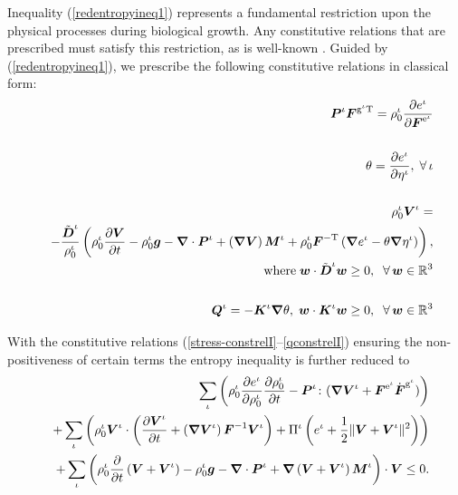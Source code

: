 \noindent Inequality (\ref{redentropyineq1}) represents a
fundamental restriction upon the physical processes during
biological growth. Any constitutive relations that are prescribed
must satisfy this restriction, as is well-known
\citep{TruesdellNoll:65}. Guided by (\ref{redentropyineq1}), we
prescribe the following constitutive relations in classical form:
\begin{eqnarray}
&&\mbox{\boldmath$ P$}^\iota\mbox{\boldmath$ F$}^{\mathrm{g}^\iota\mathrm{T}} = \rho_0^\iota
\frac{\partial e^\iota}{\partial\mbox{\boldmath$ F$}^{\mathrm{e}^\iota}}
\label{stress-constrelI}\\
\nonumber\\
&&\theta =  \frac{\partial e^\iota}{\partial \eta^\iota},\;\forall\,\iota\label{temp-constrelI}\\
\nonumber\\
&&\rho^\iota_0\mbox{\boldmath$ V$}^\iota =\nonumber\\
& &
-\frac{\tilde{\mbox{\boldmath$ D$}}^\iota}{\rho^\iota_0}\left(\rho^\iota_0\frac{\partial\mbox{\boldmath$ V$}}{\partial
t} - \rho_0^\iota\mbox{\boldmath$ g$} - \mbox{\boldmath$\nabla$}\cdot\mbox{\boldmath$ P$}^\iota +
\left(\mbox{\boldmath$\nabla$}\mbox{\boldmath$ V$}\right)\mbox{\boldmath$ M$}^\iota+\rho^\iota_0\mbox{\boldmath$ F$}^{-\mathrm{T}}\left(\mbox{\boldmath$\nabla$}
e^\iota -
\theta\mbox{\boldmath$\nabla$}\eta^\iota\right)\right),\label{VIconstrel1}\\
&&\mathrm{where}\;\mbox{\boldmath$ w$}\cdot\tilde{\mbox{\boldmath$ D$}}^\iota\mbox{\boldmath$ w$}
\ge 0,\;\;\forall\, \mbox{\boldmath$ w$} \in\mathbb{R}^3\nonumber\\
\nonumber\\
&&\mbox{\boldmath$ Q$}^\iota = -{\mbox{\boldmath$ K$}}^\iota\mbox{\boldmath$\nabla$}\theta,\;\mbox{\boldmath$ w$}\cdot{\mbox{\boldmath$ K$}}^\iota\mbox{\boldmath$ w$}
\ge 0,\;\;\forall\, \mbox{\boldmath$ w$} \in\mathbb{R}^3\label{qconstrelI}
\end{eqnarray}

\noindent With the constitutive relations
(\ref{stress-constrelI}--\ref{qconstrelI}) ensuring the
non-positiveness of certain terms the entropy inequality is
further reduced to
\begin{eqnarray}
& & \sum\limits_{\iota}\left(\rho^\iota_0\frac{\partial
e^\iota}{\partial\rho^\iota_0}\frac{\partial
\rho^\iota_0}{\partial t} - \mbox{\boldmath$ P$}^\iota\colon(\mbox{\boldmath$\nabla$}\mbox{\boldmath$ V$}^\iota +
\mbox{\boldmath$ F$}^{\mathrm{e}^\iota}\dot{\mbox{\boldmath$ F$}}^{\mathrm{g}^\iota})\right)\nonumber\\
&&+\sum\limits_{\iota}\left(
\rho^\iota_0\mbox{\boldmath$ V$}^\iota\cdot\left(\frac{\partial\mbox{\boldmath$ V$}^\iota}{\partial
t} +
\left(\mbox{\boldmath$\nabla$}\mbox{\boldmath$ V$}^\iota\right)\mbox{\boldmath$ F$}^{-1}\mbox{\boldmath$ V$}^\iota\right)+\Pi^\iota\left(e^\iota
+ \frac{1}{2}\Vert\mbox{\boldmath$ V$}+\mbox{\boldmath$ V$}^\iota\Vert^2\right)\right)\nonumber\\
&&+\sum\limits_{\iota} \left(\rho^\iota_0\frac{\partial}{\partial
t}\left(\mbox{\boldmath$ V$}+\mbox{\boldmath$ V$}^\iota\right) - \rho_0^\iota\mbox{\boldmath$ g$} -
\mbox{\boldmath$\nabla$}\cdot\mbox{\boldmath$ P$}^\iota +
\mbox{\boldmath$\nabla$}\left(\mbox{\boldmath$ V$}+\mbox{\boldmath$ V$}^\iota\right)\mbox{\boldmath$ M$}^\iota\right)\cdot\mbox{\boldmath$ V$} \le 0.
\label{dissipation1}
\end{eqnarray}

